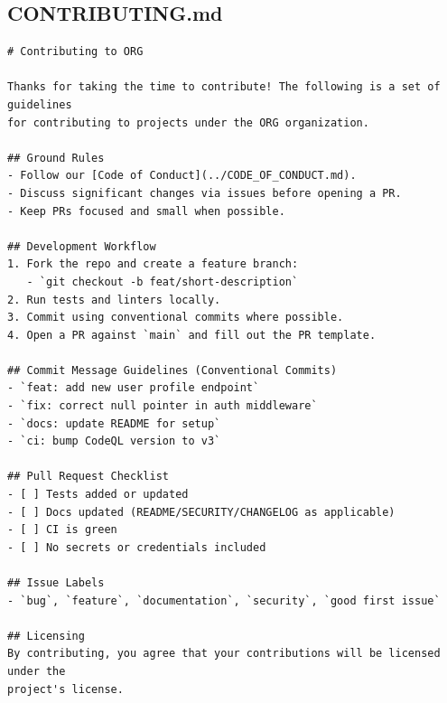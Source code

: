\documentclass[11pt,letterpaper]{article}
\begin{document}
\subsection{CONTRIBUTING.md}
\begin{verbatim}
# Contributing to ORG

Thanks for taking the time to contribute! The following is a set of guidelines
for contributing to projects under the ORG organization.

## Ground Rules
- Follow our [Code of Conduct](../CODE_OF_CONDUCT.md).
- Discuss significant changes via issues before opening a PR.
- Keep PRs focused and small when possible.

## Development Workflow
1. Fork the repo and create a feature branch:
   - `git checkout -b feat/short-description`
2. Run tests and linters locally.
3. Commit using conventional commits where possible.
4. Open a PR against `main` and fill out the PR template.

## Commit Message Guidelines (Conventional Commits)
- `feat: add new user profile endpoint`
- `fix: correct null pointer in auth middleware`
- `docs: update README for setup`
- `ci: bump CodeQL version to v3`

## Pull Request Checklist
- [ ] Tests added or updated
- [ ] Docs updated (README/SECURITY/CHANGELOG as applicable)
- [ ] CI is green
- [ ] No secrets or credentials included

## Issue Labels
- `bug`, `feature`, `documentation`, `security`, `good first issue`

## Licensing
By contributing, you agree that your contributions will be licensed under the
project's license.
\end{verbatim}
\clearpage
\end{document}
